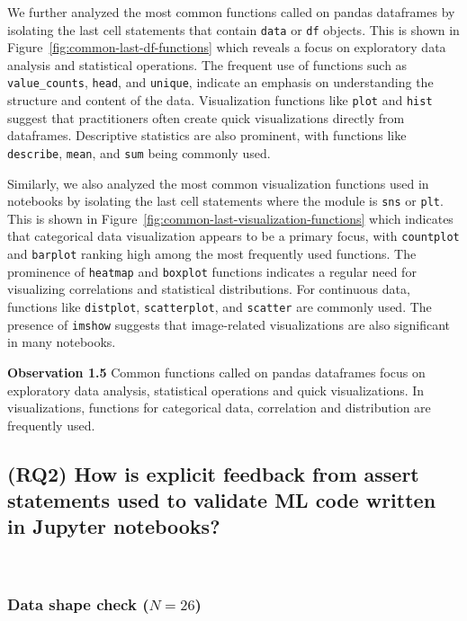 \documentclass[smallextended]{svjour3}       %
\newcommand{\highlight}[1]{\begin{framed}%
  \noindent#1
\end{framed}}
\begin{document}
We further analyzed the most common functions called on pandas dataframes by isolating the last cell statements that contain \lstinline{data} or \lstinline{df} objects. This is shown in Figure~\ref{fig:common-last-df-functions} which reveals a focus on exploratory data analysis and statistical operations. The frequent use of functions such as \lstinline{value_counts}, \lstinline{head}, and \lstinline{unique}, indicate an emphasis on understanding the structure and content of the data. Visualization functions like \lstinline{plot} and \lstinline{hist} suggest that practitioners often create quick visualizations directly from dataframes. Descriptive statistics are also prominent, with functions like \lstinline{describe}, \lstinline{mean}, and \lstinline{sum} being commonly used.

Similarly, we also analyzed the most common visualization functions used in notebooks by isolating the last cell statements where the module is \lstinline{sns} or \lstinline{plt}. This is shown in Figure~\ref{fig:common-last-visualization-functions} which indicates that categorical data visualization appears to be a primary focus, with \lstinline{countplot} and \lstinline{barplot} ranking high among the most frequently used functions. The prominence of \lstinline{heatmap} and \lstinline{boxplot} functions indicates a regular need for visualizing correlations and statistical distributions. For continuous data, functions like \lstinline{distplot}, \lstinline{scatterplot}, and \lstinline{scatter} are commonly used. The presence of \lstinline{imshow} suggests that image-related visualizations are also significant in many notebooks.

\highlight{\textbf{Observation 1.5} Common functions called on pandas dataframes focus on exploratory data analysis, statistical operations and quick visualizations. In visualizations, functions for categorical data, correlation and distribution are frequently used.}

\subsection{(RQ2) How is explicit feedback from assert statements used to validate ML code written in Jupyter notebooks?}~\label{sec:result-explicit}

\subsubsection{Data shape check ($N = 26$)}
\end{document}
